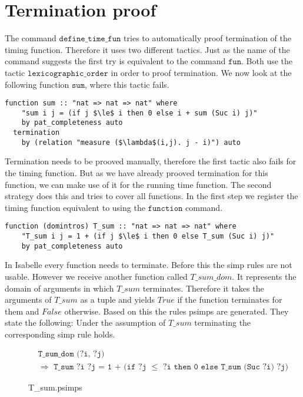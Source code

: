 

\section{Termination proof} \label{chapter:termination}

The command $\texttt{define\_time\_fun}$ tries to automatically proof termination of the timing function.
Therefore it uses two different tactics.
Just as the name of the command suggests the first try is equivalent to the command $\texttt{fun}$.
Both use the tactic $\texttt{lexicographic\_order}$ in order to proof termination.
We now look at the following function $\texttt{sum}$, where this tactic fails.
\begin{lstlisting}[language=isabelle,mathescape=true]
  function sum :: "nat => nat => nat" where
    "sum i j = (if j $\le$ i then 0 else i + sum (Suc i) j)"
    by pat_completeness auto
  termination
    by (relation "measure ($\lambda$(i,j). j - i)") auto
\end{lstlisting}

Termination needs to be prooved manually, therefore the first tactic also fails for the timing function.
But as we have already prooved termination for this function, we can make use of it for the running time function.
The second strategy does this and tries to cover all functions.
In the first step we register the timing function equivalent to using the $\texttt{function}$ command.
\begin{lstlisting}[language=isabelle,mathescape=true,caption=Function registration,label=lst:sum_reg]
  function (domintros) T_sum :: "nat => nat => nat" where
    "T_sum i j = 1 + (if j $\le$ i then 0 else T_sum (Suc i) j)"
    by pat_completeness auto
\end{lstlisting}
In Isabelle every function needs to terminate.
Before this the simp rules are not usable.
However we receive another function called $T\_sum\_dom$.
It represents the domain of arguments in which $T\_sum$ terminates.
Therefore it takes the arguments of $T\_sum$ as a tuple and yields $True$ if the function terminates for them and $False$ otherwise.
Based on this the rules psimps are generated.
They state the following: Under the assumption of $T\_sum$ terminating the corresponding simp rule holds.

\begin{figure}[H]
\begin{align*}
  &\texttt{T\_sum\_dom (?i, ?j)}\\
  &\texttt{$\Longrightarrow$ T\_sum ?i ?j = 1 + (if ?j $\le$ ?i then 0 else T\_sum (Suc ?i) ?j)}
\end{align*}
\caption{T\_sum.psimps}
\end{figure}

